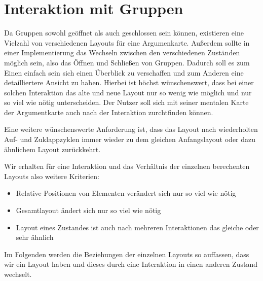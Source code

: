 

\section{Interaktion mit Gruppen}
Da Gruppen sowohl geöffnet als auch geschlossen sein können, existieren eine Vielzahl von verschiedenen Layouts für eine Argumenkarte.
Außerdem sollte in einer Implementierung das Wechseln zwischen den verschiedenen Zuständen möglich sein, also das Öffnen und Schließen von Gruppen. 
Dadurch soll es zum Einen einfach sein sich einen Überblick zu verschaffen und zum Anderen eine detailliertere Ansicht zu haben.
Hierbei ist höchst wünschenswert, dass bei einer solchen Interaktion das alte und neue Layout nur so wenig wie möglich und nur so viel wie nötig unterscheiden. 
Der Nutzer soll sich mit seiner mentalen Karte der Argumentkarte auch nach der Interaktion zurchtfinden können.

Eine weitere wünschenswerte Anforderung ist, dass das Layout nach wiederholten Auf- und Zuklappzyklen immer wieder zu dem gleichen Anfangslayout oder dazu ähnlichem Layout zurückkehrt.

Wir erhalten für eine Interaktion und das Verhältnis der einzelnen berechenten Layouts also weitere Kriterien:
\begin{itemize}
\item Relative Positionen von Elementen verändert sich nur so viel wie nötig
\item Gesamtlayout ändert sich nur so viel wie nötig
\item Layout eines Zustandes ist auch nach mehreren Interaktionen das gleiche oder sehr ähnlich
\end{itemize}


Im Folgenden werden die Beziehungen der einzelnen Layouts so auffassen, dass wir ein Layout haben und dieses durch eine Interaktion in einen anderen Zustand wechselt.


